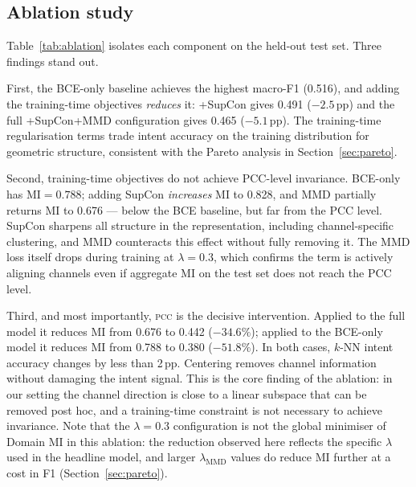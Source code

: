 \documentclass[preprint,12pt,authoryear]{elsarticle}
\newcommand{\pcc}{\textsc{pcc}}
\begin{document}
\subsection{Ablation study}
\label{sec:ablation}

Table~\ref{tab:ablation} isolates each component on the held-out test
set. Three findings stand out.

First, the BCE-only baseline achieves the highest macro-F1 (0.516),
and adding the training-time objectives \emph{reduces} it: +SupCon
gives 0.491 ($-2.5$\,pp) and the full +SupCon+MMD configuration
gives 0.465 ($-5.1$\,pp). The training-time regularisation terms
trade intent accuracy on the training distribution for geometric
structure, consistent with the Pareto analysis in
Section~\ref{sec:pareto}.

Second, training-time objectives do not achieve PCC-level
invariance. BCE-only has $\text{MI} = 0.788$; adding SupCon
\emph{increases} MI to 0.828, and MMD partially returns MI to
0.676 --- below the BCE baseline, but far from the PCC level. SupCon
sharpens all structure in the representation, including
channel-specific clustering, and MMD counteracts this effect without
fully removing it. The MMD loss itself drops during training at
$\lambda = 0.3$, which confirms the term is actively aligning
channels even if aggregate MI on the test set does not reach the
PCC level.

Third, and most importantly, \pcc{} is the decisive intervention.
Applied to the full model it reduces MI from 0.676 to 0.442
($-34.6\%$); applied to the BCE-only model it reduces MI from 0.788
to 0.380 ($-51.8\%$). In both cases, $k$-NN intent accuracy changes
by less than 2\,pp. Centering removes channel information without
damaging the intent signal. This is the core finding of the
ablation: in our setting the channel direction is close to a linear
subspace that can be removed post hoc, and a training-time
constraint is not necessary to achieve invariance. Note that the
$\lambda=0.3$ configuration is not the global minimiser of Domain
MI in this ablation: the reduction observed here reflects the
specific $\lambda$ used in the headline model, and larger
$\lambda_{\text{MMD}}$ values do reduce MI further at a cost in F1
(Section~\ref{sec:pareto}).
\end{document}

